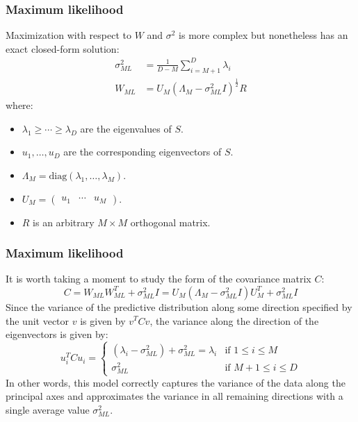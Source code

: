 \documentclass{beamer}
\begin{document}
\begin{frame}
    \frametitle{Maximum likelihood}
    Maximization with respect to $W$ and $\sigma^{2}$ is more complex but nonetheless has an exact closed-form solution:
    \begin{align*}
        \sigma^{2}_{ML}&=\frac{1}{D-M}\sum_{i=M+1}^{D}\lambda_{i} \\
        W_{ML}&=U_{M}(\Lambda_{M}-\sigma^{2}_{ML}I)^{\frac{1}{2}}R
    \end{align*}
    where:
    \begin{itemize}
        \item $\lambda_{1}\ge\cdots\ge\lambda_{D}$ are the eigenvalues of $S$.
        \item $u_{1},\hdots,u_{D}$ are the corresponding eigenvectors of $S$.
        \item $\Lambda_{M}=\mathrm{diag}(\lambda_{1},\hdots,\lambda_{M})$.
        \item $U_{M}=\begin{pmatrix}
            u_{1}&\cdots&u_{M}
        \end{pmatrix}$.
        \item $R$ is an arbitrary $M\times{}M$ orthogonal matrix.
    \end{itemize}
\end{frame}

\begin{frame}
    \frametitle{Maximum likelihood}
    It is worth taking a moment to study the form of the covariance matrix $C$:
    \begin{equation*}
        C=W_{ML}W_{ML}^{T}+\sigma^{2}_{ML}I=U_{M}(\Lambda_{M}-\sigma^{2}_{ML}I)U_{M}^{T}+\sigma^{2}_{ML}I
    \end{equation*}
    Since the variance of the predictive distribution along some direction specified by the unit vector $v$ is given by $v^{T}Cv$, the variance along the direction of the eigenvectors is given by:
    \begin{equation*}
        u_{i}^{T}Cu_{i}=\begin{cases}
            (\lambda_{i}-\sigma^{2}_{ML})+\sigma^{2}_{ML}=\lambda_{i}&\textrm{if }1\le{}i\le{}M \\
            \sigma^{2}_{ML}&\textrm{if }M+1\le{}i\le{}D
        \end{cases}
    \end{equation*}
    In other words, this model correctly captures the variance of the data along the principal axes and approximates the variance in all remaining directions with a single average value $\sigma^{2}_{ML}$.
\end{frame}
\end{document}
